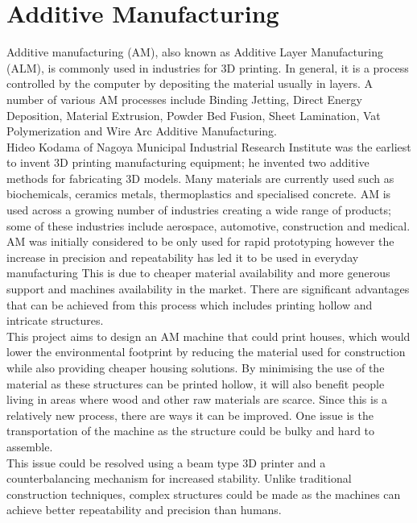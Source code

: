 \documentclass{UoNMCHA}
\numberwithin{equation}{section}
\begin{document}
	\section{Additive Manufacturing}\label{Additive Manufacturing}
	
	Additive manufacturing (AM), also known as Additive Layer Manufacturing (ALM), is commonly used in industries for 3D printing. In general, it is a process controlled by the computer by depositing the material usually in layers. A number of various AM processes include Binding Jetting, Direct Energy Deposition, Material Extrusion, Powder Bed Fusion, Sheet Lamination, Vat Polymerization and Wire Arc Additive Manufacturing. \\
	Hideo Kodama of Nagoya Municipal Industrial Research Institute was the earliest to invent 3D printing manufacturing equipment; he invented two additive methods for fabricating 3D models. Many materials are currently used such as biochemicals, ceramics metals, thermoplastics and specialised concrete. AM is used across a growing number of industries creating a wide range of products; some of these industries include aerospace, automotive, construction and medical. \\
	AM was initially considered to be only used for rapid prototyping however the increase in precision and repeatability has led it to be used in everyday manufacturing This is due to cheaper material availability and more generous support and machines availability in the market. There are significant advantages that can be achieved from this process which includes printing hollow and intricate structures. \\
	This project aims to design an AM machine that could print houses, which would lower the environmental footprint by reducing the material used for construction while also providing cheaper housing solutions.  By minimising the use of the material as these structures can be printed hollow, it will also benefit people living in areas where wood and other raw materials are scarce. Since this is a relatively new process, there are ways it can be improved. One issue is the transportation of the machine as the structure could be bulky and hard to assemble.  \\
	This issue could be resolved using a beam type 3D printer and a counterbalancing mechanism for increased stability. Unlike traditional construction techniques, complex structures could be made as the machines can achieve better repeatability and precision than humans. \\
	
\end{document}
